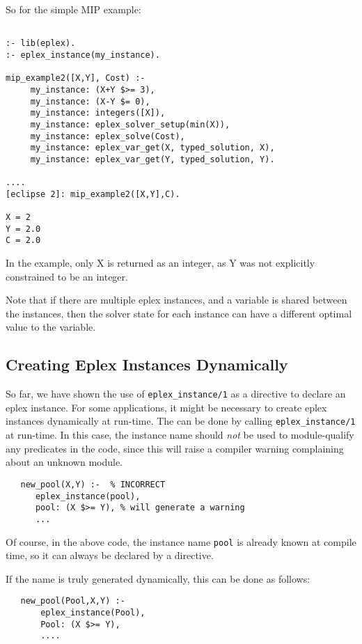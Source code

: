 So for the simple MIP example:
\begin{verbatim}

:- lib(eplex).
:- eplex_instance(my_instance).

mip_example2([X,Y], Cost) :-
     my_instance: (X+Y $>= 3),
     my_instance: (X-Y $= 0),
     my_instance: integers([X]),
     my_instance: eplex_solver_setup(min(X)),
     my_instance: eplex_solve(Cost),
     my_instance: eplex_var_get(X, typed_solution, X),
     my_instance: eplex_var_get(Y, typed_solution, Y).

....
[eclipse 2]: mip_example2([X,Y],C).

X = 2
Y = 2.0
C = 2.0

\end{verbatim}

In the example, only X is returned as an integer, as Y was not explicitly
constrained to be an integer.

Note that if there are multiple eplex instances, and a variable is shared
between the instances, then the solver state for each instance can have a
different optimal value to the variable.

\subsection{Creating Eplex Instances Dynamically}
So far, we have shown the use of {\tt eplex_instance/1} as a directive to
declare an eplex instance. For some applications, it might be necessary to
create eplex instances dynamically at run-time. The can be done by calling
{\tt eplex_instance/1} at run-time.
In this case, the instance name should {\em not} be used to module-qualify
any predicates in the code, since this will raise a compiler warning
complaining about an unknown module.

\begin{verbatim}
   new_pool(X,Y) :-  % INCORRECT
      eplex_instance(pool),
      pool: (X $>= Y), % will generate a warning
      ...
\end{verbatim}
\noindent
Of course, in the above code, the instance name {\tt pool} is already known
at compile time, so it can always be declared by a directive.

If the name is truly generated dynamically, this can be done as follows:
\begin{verbatim}
   new_pool(Pool,X,Y) :-
       eplex_instance(Pool),
       Pool: (X $>= Y),
       ....
\end{verbatim}

